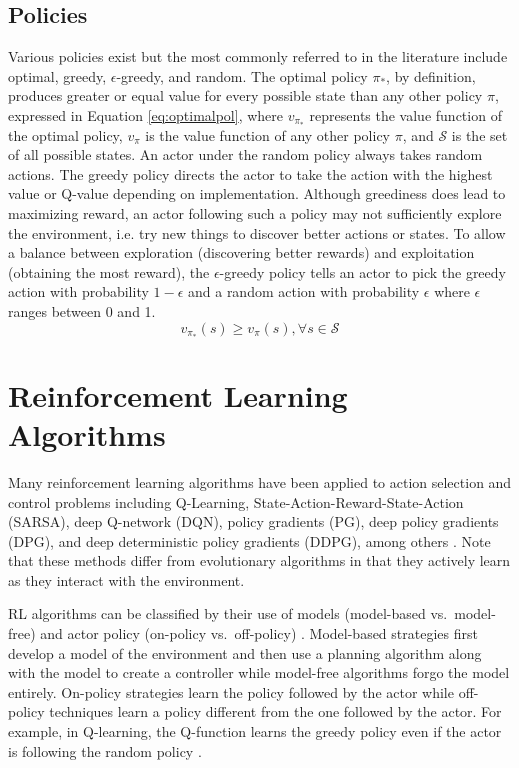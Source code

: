 \subsection{Policies}
Various policies exist but the most commonly referred to in the literature include optimal, greedy, $\epsilon$-greedy, and random. The optimal policy $\pi_*$, by definition, produces greater or equal value for every possible state than any other policy $\pi$, expressed in Equation \ref{eq:optimalpol}, where $v_{\pi_*}$ represents the value function of the optimal policy, $v_{\pi}$ is the value function of any other policy $\pi$, and $\mathcal{S}$ is the set of all possible states. An actor under the random policy always takes random actions. The greedy policy directs the actor to take the action with the highest value or Q-value depending on implementation. Although greediness does lead to maximizing reward, an actor following such a policy may not sufficiently explore the environment, i.e. try new things to discover better actions or states. To allow a balance between exploration (discovering better rewards) and exploitation (obtaining the most reward), the $\epsilon$-greedy policy tells an actor to pick the greedy action with probability $1-\epsilon$ and a random action with probability $\epsilon$ where $\epsilon$ ranges between 0 and 1. 
\begin{equation}
	\label{eq:optimalpol}
v_{\pi_*}(s) \geq v_{\pi}(s), \forall s \in \mathcal{S}
\end{equation}

\section{Reinforcement Learning Algorithms}
Many reinforcement learning algorithms have been applied to action selection and control problems including Q-Learning, State-Action-Reward-State-Action (SARSA), deep Q-network (DQN), policy gradients (PG), deep policy gradients (DPG), and deep deterministic policy gradients (DDPG), among others \cite{sutton_2017}\cite{sutton_policygrad}\cite{silver_2017}\cite{silver_lever_heess_degris_wierstra_riedmiller}\cite{lillicrap_2016}. Note that these methods differ from evolutionary algorithms in that they actively learn as they interact with the environment.

RL algorithms can be classified by their use of models (model-based vs.\ model-free) and actor policy (on-policy vs.\ off-policy) \cite{sutton_2017}. Model-based strategies first develop a model of the environment and then use a planning algorithm along with the model to create a controller while model-free algorithms forgo the model entirely. On-policy strategies learn the policy followed by the actor while off-policy techniques learn a policy different from the one followed by the actor. For example, in Q-learning, the Q-function learns the greedy policy even if the actor is following the random policy \cite{sutton_2017}. 

